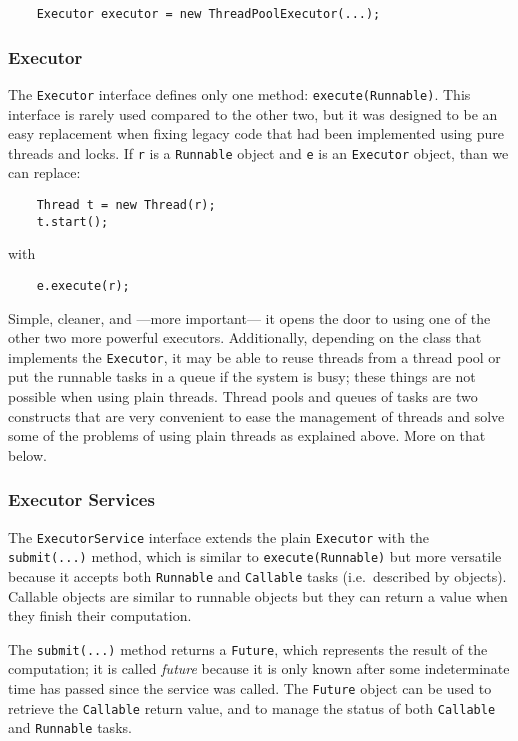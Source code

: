 \begin{verbatim}
    Executor executor = new ThreadPoolExecutor(...);
\end{verbatim}

\subsubsection{Executor}
\label{sec:executor}

The \verb+Executor+ interface defines only one method:
\verb+execute(Runnable)+. This interface is rarely used compared to
the other two, but it was designed to be an easy replacement when
fixing legacy code that had been implemented using pure threads and
locks. If \verb+r+ is a \verb+Runnable+ object and \verb+e+ is an
\verb+Executor+ object, than we can replace:

\begin{verbatim}
    Thread t = new Thread(r);
    t.start();
\end{verbatim}

with 

\begin{verbatim}
    e.execute(r);
\end{verbatim}

Simple, cleaner, and ---more important--- it opens the door to using
one of the other two more powerful executors. Additionally, depending
on the class that implements the \verb+Executor+, it may be able to
reuse threads from a thread pool or put the runnable tasks in a queue
if the system is busy; these things are not possible when using plain
threads. Thread pools and queues of tasks are two constructs that
are very convenient to ease the management of threads and solve some
of the problems of using plain threads as explained above. More on
that below. 

\subsubsection{Executor Services}
\label{sec:executor-services}

The \verb+ExecutorService+ interface extends the plain \verb+Executor+
with the \verb+submit(...)+ method, which is similar to
\verb+execute(Runnable)+ but more versatile because it accepts both
\verb+Runnable+ and \verb+Callable+ tasks (i.e.~described by
objects). Callable objects are similar to runnable objects but they
can return a value when they finish their computation. 

The \verb+submit(...)+ method returns a \verb+Future+, which represents
the result of the computation; it is called \emph{future} because it
is only known after some indeterminate time has passed since the service
was called. The \verb+Future+ object can be used to retrieve the
\verb+Callable+ return value, 
and to manage the status of both \verb+Callable+ and
\verb+Runnable+ tasks. 

